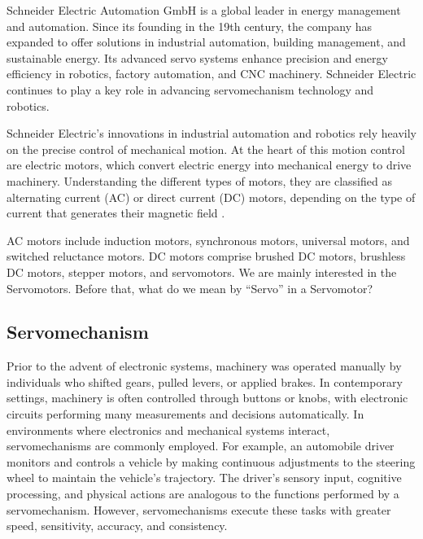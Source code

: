 Schneider Electric Automation GmbH is a global leader in energy management and automation. Since its founding in the 19th century, the company has expanded to offer solutions in industrial automation, building management, and sustainable energy. Its advanced servo systems enhance precision and energy efficiency in robotics, factory automation, and CNC machinery. Schneider Electric continues to play a key role in advancing servomechanism technology and robotics.

Schneider Electric’s innovations in industrial automation and robotics rely heavily on the precise control of mechanical motion. At the heart of this motion control are electric motors, which convert electric energy into mechanical energy to drive machinery. Understanding the different types of motors, they are classified as alternating current (AC) or direct current (DC) motors, depending on the type of current that generates their magnetic field \cite{Motors2024}.

\acs{AC} motors include induction motors, synchronous motors, universal motors, and switched reluctance motors. \acs{DC} motors comprise brushed \acs{DC} motors, brushless \acs{DC} motors, stepper motors, and servomotors. We are mainly interested in the Servomotors. Before that, what do we mean by “Servo” in a Servomotor? 

\subsection{Servomechanism}
\label{sec:intro:Servomechanism}

Prior to the advent of electronic systems, machinery was operated manually by individuals who shifted gears, pulled levers, or applied brakes. In contemporary settings, machinery is often controlled through buttons or knobs, with electronic circuits performing many measurements and decisions automatically. In environments where electronics and mechanical systems interact, servomechanisms are commonly employed. For example, an automobile driver monitors and controls a vehicle by making continuous adjustments to the steering wheel to maintain the vehicle's trajectory. The driver's sensory input, cognitive processing, and physical actions are analogous to the functions performed by a servomechanism. However, servomechanisms execute these tasks with greater speed, sensitivity, accuracy, and consistency. \cite{Poptronics1959}

